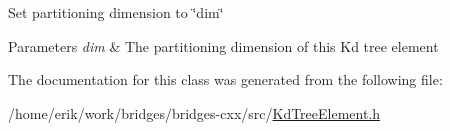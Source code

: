 Set partitioning dimension to \char`\"{}dim\char`\"{}


\begin{DoxyParams}{Parameters}
{\em dim} & The partitioning dimension of this Kd tree element \\
\hline
\end{DoxyParams}


The documentation for this class was generated from the following file\+:\begin{DoxyCompactItemize}
\item 
/home/erik/work/bridges/bridges-\/cxx/src/\hyperlink{_kd_tree_element_8h}{Kd\+Tree\+Element.\+h}\end{DoxyCompactItemize}
